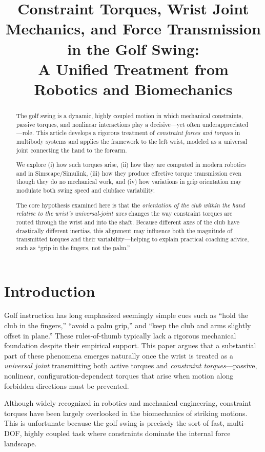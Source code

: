 \documentclass[11pt]{article}
\title{Constraint Torques, Wrist Joint Mechanics, and Force Transmission in the Golf Swing:\\
A Unified Treatment from Robotics and Biomechanics}
\author{ }
\date{ }
\begin{document}
\maketitle

\begin{abstract}
The golf swing is a dynamic, highly coupled motion in which mechanical constraints, passive torques, 
and nonlinear interactions play a decisive---yet often underappreciated---role.  
This article develops a rigorous treatment of \emph{constraint forces and torques} in multibody systems 
and applies the framework to the left wrist, modeled as a universal joint connecting the hand to the 
forearm.  

We explore (i) how such torques arise, (ii) how they are computed in modern robotics and in 
Simscape/Simulink, (iii) how they produce effective torque transmission even though they do no mechanical 
work, and (iv) how variations in grip orientation may modulate both swing speed and clubface variability.  

The core hypothesis examined here is that the \emph{orientation of the club within the hand relative to the wrist's universal-joint axes} 
changes the way constraint torques are routed through the wrist and into the shaft.  
Because different axes of the club have drastically different inertias, this alignment may influence both 
the magnitude of transmitted torques and their variability---helping to explain practical coaching advice, 
such as ``grip in the fingers, not the palm.''  
\end{abstract}

\section{Introduction}

Golf instruction has long emphasized seemingly simple cues such as 
``hold the club in the fingers,'' 
``avoid a palm grip,'' and 
``keep the club and arms slightly offset in plane.''  
These rules-of-thumb typically lack a rigorous mechanical foundation despite their empirical support.  
This paper argues that a substantial part of these phenomena emerges naturally once the wrist 
is treated as a \emph{universal joint} transmitting both active torques and 
\emph{constraint torques}---passive, nonlinear, configuration-dependent torques that arise 
when motion along forbidden directions must be prevented.

Although widely recognized in robotics and mechanical engineering, constraint torques have been 
largely overlooked in the biomechanics of striking motions.  
This is unfortunate because the golf swing is precisely the sort of fast, multi-DOF, highly coupled 
task where constraints dominate the internal force landscape.  
\end{document}
